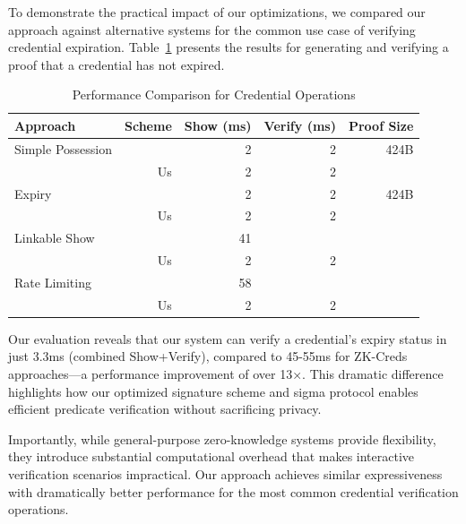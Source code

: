 To demonstrate the practical impact of our optimizations, we compared our approach against alternative systems for the common use case of verifying credential expiration. Table~\ref{tab:expiry-comparison} presents the results for generating and verifying a proof that a credential has not expired.



\begin{table}[htbp]
\centering
\caption{Performance Comparison for Credential Operations}
\label{tab:expiry-comparison}
\begin{tabular}{lrrrr}
\toprule
\textbf{Approach} & \textbf{Scheme} & \textbf{Show (ms)} & \textbf{Verify (ms)} & \textbf{Proof Size} \\
\midrule
Simple Possession & \cite{rosenberg_zk-creds_2022} & 2 & 2 & 424B \\
& Us & 2 & 2 & \\
\midrule
Expiry & \cite{rosenberg_zk-creds_2022} & 2 & 2 & 424B \\
& Us & 2 & 2 & \\
\midrule
Linkable Show & \cite{rosenberg_zk-creds_2022} & 41 &  &  \\
& Us & 2 & 2 & \\
\midrule
Rate Limiting & \cite{rosenberg_zk-creds_2022} & 58 &  &  \\
& Us & 2 & 2 & \\
\bottomrule
\end{tabular}
\end{table}

Our evaluation reveals that our system can verify a credential's expiry status in just 3.3ms (combined Show+Verify), compared to 45-55ms for ZK-Creds approaches—a performance improvement of over 13×. This dramatic difference highlights how our optimized signature scheme and sigma protocol enables efficient predicate verification without sacrificing privacy.

Importantly, while general-purpose zero-knowledge systems provide flexibility, they introduce substantial computational overhead that makes interactive verification scenarios impractical. Our approach achieves similar expressiveness with dramatically better performance for the most common credential verification operations.























